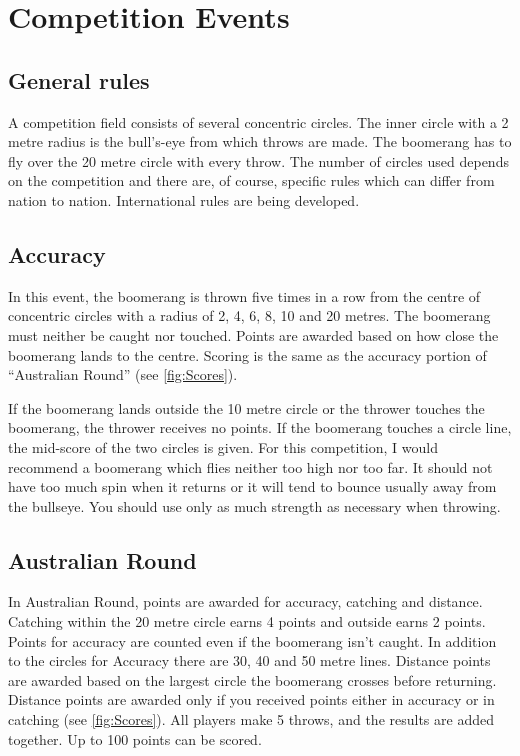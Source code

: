 \chapter{Competition Events}
\newpage

\section{General rules}
A competition field consists of several concentric circles. The inner circle with a 2 metre radius is the bull’s-eye from which throws are made. The boomerang has to fly over the 20 metre circle with every throw. The number of circles used depends on the competition and there are, of course, specific rules which can differ from nation to nation. International rules are being developed.

\section{Accuracy}
In this event, the boomerang is thrown five times in a row from the centre of concentric circles with a radius of 2, 4, 6, 8, 10 and 20 metres. The boomerang must neither be caught nor touched. Points are awarded based on how close the boomerang lands to the centre. Scoring is the same as the accuracy portion of ``Australian Round'' (see \ref{fig:Scores}).

If the boomerang lands outside the 10 metre circle or the thrower touches the boomerang, the thrower receives no points. If the boomerang touches a circle line, the mid-score of the two circles is given.
For this competition, I would recommend a boomerang which flies neither too high nor too far. It should not have too much spin when it returns or it will tend to bounce usually away from the bullseye. You should use only as much strength as necessary when throwing.
\newpage

\section{Australian Round}
In Australian Round, points are awarded for accuracy, catching and distance. Catching within the 20 metre circle earns 4 points and outside earns 2 points. Points for accuracy are counted even if the boomerang isn’t caught. In addition to the circles for Accuracy there are 30, 40 and 50 metre lines. Distance points are awarded based on the largest circle the boomerang crosses before returning. Distance points are awarded only if you received points either in accuracy or in catching (see \ref{fig:Scores}).
All players make 5 throws, and the results are added together. Up to 100 points can be scored. 

